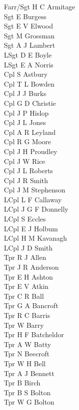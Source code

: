 \begin{multicols}{3}
  \small
  \noindent
  Farr/Sgt H C Armitage \\
  Sgt E Burgess \\
  Sgt E V Elwood \\
  Sgt M Grossman \\
  Sgt A J Lambert \\
  LSgt D E Boyle \\
  LSgt E A Norris \\
  Cpl S Astbury \\
  Cpl T L Bowden \\
  Cpl J J Burks \\
  Cpl G D Christie \\
  Cpl J P Hislop \\
  Cpl J L Jones \\
  Cpl A R Leyland \\
  Cpl R G Moore \\
  Cpl J H Proudley \\
  Cpl J W Rice \\
  Cpl J L Roberts \\
  Cpl J R Smith \\
  Cpl J M Stephenson \\
  LCpl L F Callaway \\
  LCpl J G F Donnelly \\
  LCpl S Eccles \\
  LCpl E J Holbum \\
  LCpl H M Kavanagh \\
  LCpl J D Smith \\
  Tpr R J Allen \\
  Tpr J R Anderson \\
  Tpr E H Ashton \\
  Tpr E V Atkin \\
  Tpr C R Ball \\
  Tpr G A Bancroft \\
  Tpr R C Barris \\
  Tpr W Barry \\
  Tpr H F Batcheldor \\
  Tpr A W Batty \\
  Tpr N Beecroft \\
  Tpr W H Bell \\
  Tpr A J Bennett \\
  Tpr B Birch \\
  Tpr B S Bolton \\
  Tpr W G Bolton \\

\end{multicols}
